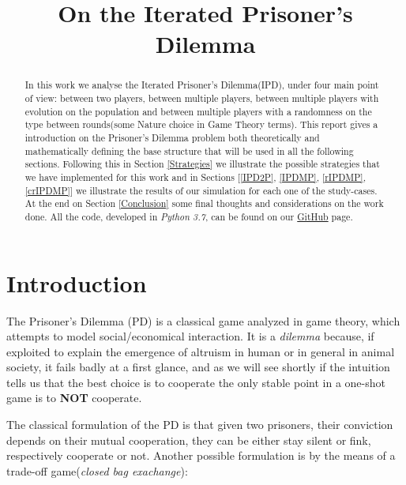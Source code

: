 \documentclass[journal,a4paper,10pt,twoside]{IEEEtran}
\begin{document}
\title{On the Iterated Prisoner's Dilemma}

\author{%

}

\maketitle

\begin{abstract}
In this work we analyse the Iterated Prisoner's Dilemma(IPD), under four main point of view: between two players, between multiple players, between multiple players with evolution on the population and between multiple players with a randomness on the type between rounds(some Nature choice in Game Theory terms).
This report gives a introduction on the Prisoner's Dilemma problem both theoretically and mathematically defining the base structure that will be used in all the following sections.
Following this in Section \ref{Strategies} we illustrate the possible strategies that we have implemented for this work and in Sections [\ref{IPD2P}, \ref{IPDMP}, \ref{rIPDMP}, \ref{crIPDMP}] we illustrate the results of our simulation for each one of the study-cases. At the end on Section \ref{Conclusion} some final thoughts and considerations on the work done.
All the code, developed in \textit{Python 3.7}, can be found on our \href{https://github.com/eliabntt/LaboratoryOfComputationalPhysics/tree/Group9}{GitHub} page.
\end{abstract}

\section{Introduction} 
The Prisoner's Dilemma (PD) is a classical game analyzed in game theory, which attempts to model social/economical interaction. It is a \textit{dilemma} because, if exploited to explain the emergence of altruism in human or in general in animal society, it fails badly at a first glance, and as we will see shortly if the intuition tells us that the best choice is to cooperate the only stable point in a one-shot game is to \textbf{NOT} cooperate.

The classical formulation of the PD is that given two prisoners, their conviction depends on their mutual cooperation, they can be either stay silent or fink, respectively cooperate or not. 
Another possible formulation is by the means of a trade-off game(\textit{closed bag exachange}):
\end{document}

